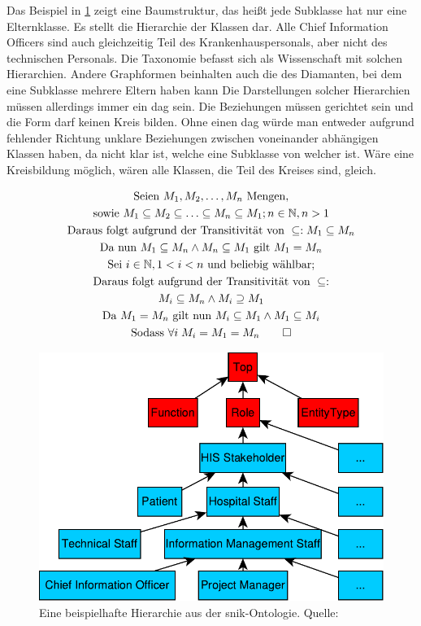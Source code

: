 Das Beispiel in \cref{fig:snikhierarchy} zeigt eine Baumstruktur, das heißt jede Subklasse hat nur eine Elternklasse.
Es stellt die Hierarchie der Klassen dar.
Alle Chief Information Officers sind auch gleichzeitig Teil des Krankenhauspersonals, aber nicht des technischen Personals.
Die Taxonomie befasst sich als Wissenschaft mit solchen Hierarchien.
Andere Graphformen beinhalten auch die des Diamanten, bei dem eine Subklasse mehrere Eltern haben kann
Die Darstellungen solcher Hierarchien müssen allerdings immer ein \ac{dag} sein.
Die Beziehungen müssen gerichtet sein und die Form darf keinen Kreis bilden.
Ohne einen \ac{dag} würde man entweder aufgrund fehlender Richtung unklare Beziehungen zwischen voneinander abhängigen Klassen haben, da nicht klar ist, welche eine Subklasse von welcher ist.
Wäre eine Kreisbildung möglich, wären alle Klassen, die Teil des Kreises sind, gleich.

\begin{gather*}
\text{Seien } M_1, M_2, \ldots, M_n \text{ Mengen,} \\
\text{sowie } M_1 \subseteq M_2 \subseteq \ldots \subseteq M_n \subseteq M_1; n \in \mathbb{N}, n > 1 \\
\text{Daraus folgt aufgrund der Transitivität von } \subseteq: M_1 \subseteq M_n \\
\text{Da nun } M_1 \subseteq M_n \land M_n \subseteq M_1 \text{ gilt } M_1 = M_n \\
\text{Sei } i \in \mathbb{N}, 1 < i < n \text{ und beliebig wählbar;} \\
\text{Daraus folgt aufgrund der Transitivität von } \subseteq: \\
M_i \subseteq M_n \land M_i \supseteq M_1 \\
\text{Da } M_1 = M_n \text{ gilt nun } M_i \subseteq M_1 \land M_1 \subseteq M_i \\
\text{Sodass }\forall i\; M_i = M_1 = M_n \qed
\end{gather*}

\begin{figure}[ht]%
\centering
\includegraphics[width=\textwidth, height=\textheight, keepaspectratio]{Images/hierarchy.pdf}
\caption[Beispiel für Hierarchie]{Eine beispielhafte Hierarchie aus der \acs{snik}-Ontologie. Quelle: \citet{snikgraphposter}}
\label{fig:snikhierarchy}
\end{figure}


